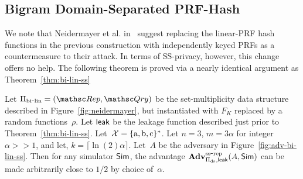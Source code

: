 

\subsection{Bigram Domain-Separated PRF-Hash}
We note that Neidermayer et al. in~\cite{xxx} suggest replacing the linear-PRF hash functions in the previous construction with independently keyed PRFs as a countermeasure to their attack.  In terms of SS-privacy, however, this change offers no help.  The following theorem is proved via a nearly identical argument as Theorem~\ref{thm:bi-lin-ss}

\begin{theorem}\label{thm:bi-ds-ss}
Let $\Pi_{\bilin}= (\Rep, \Qry)$ be the set-multiplicity data structure described in Figure~\ref{fig:neidermayer}, but instantiated with $F_{K}$ replaced by a random functions~$\rho$.  Let ${\sf leak}$ be the leakage function described just prior to Theorem~\ref{thm:bi-lin-ss}.   Let~${\cal X}=\{\mathrm{a,b,c}\}^*$. Let $n=3$,  $m=3\alpha $ for integer $\alpha >> 1$, and let, $k = \lceil \ln(2) \alpha \rceil$.  Let~$A$ be the adversary in Figure~\ref{fig:adv-bi-lin-ss}.  Then for any simulator ${\sf Sim}$,
the advantage $\mathrm{\mathbf{Adv}}^{\mathrm{ss\mbox{-}rep}}_{\Pi_{\mathrm{ds}},{\sf leak}}(A,{\sf Sim})$ can be made arbitrarily close to $1/2$ by choice of~$\alpha$.
\end{theorem}


